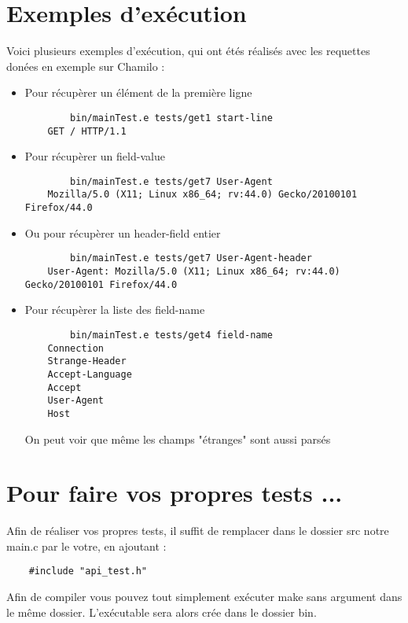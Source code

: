 \documentclass{article}
\begin{document}
    \section{Exemples d'exécution} %
        Voici plusieurs exemples d'exécution, qui ont étés réalisés avec les requettes donées en exemple sur Chamilo :
        \begin{itemize}
                    \item Pour récupèrer un élément de la première ligne
                        \begin{lstlisting}
        bin/mainTest.e tests/get1 start-line
    GET / HTTP/1.1
                        \end{lstlisting}
                        
                    \item Pour récupèrer un field-value
                        \begin{lstlisting}
        bin/mainTest.e tests/get7 User-Agent
    Mozilla/5.0 (X11; Linux x86_64; rv:44.0) Gecko/20100101 Firefox/44.0
                        \end{lstlisting}
                        
                     \item Ou pour récupèrer un header-field entier
                        \begin{lstlisting}
        bin/mainTest.e tests/get7 User-Agent-header
    User-Agent:	Mozilla/5.0 (X11; Linux x86_64; rv:44.0) Gecko/20100101 Firefox/44.0
                        \end{lstlisting}

                    \item Pour récupèrer la liste des field-name
                        \begin{lstlisting}
        bin/mainTest.e tests/get4 field-name
    Connection
    Strange-Header
    Accept-Language
    Accept
    User-Agent
    Host
                        \end{lstlisting}
    On peut voir que même les champs "étranges" sont aussi parsés
    
    \end{itemize}
    
    \section{Pour faire vos propres tests ...} %
        Afin de réaliser vos propres tests, il suffit de remplacer dans le dossier src notre main.c par le votre, en ajoutant :
        \begin{lstlisting}
    #include "api_test.h"
        \end{lstlisting}
        Afin de compiler vous pouvez tout simplement exécuter make sans argument dans le même dossier. L'exécutable sera alors crée dans le dossier bin.
        
\end{document}
